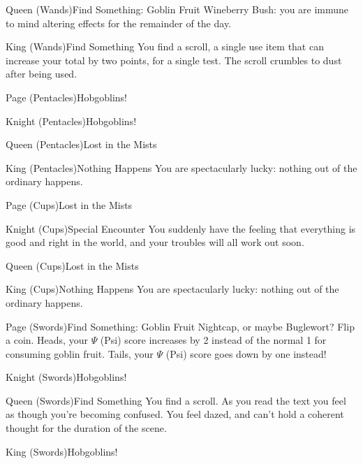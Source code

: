 \documentclass[white]{gl2018}
\begin{document}
\begin{location}{Queen (Wands)}{Find Something: Goblin Fruit}
Wineberry Bush: you are immune to mind altering effects for the remainder of the day.
\end{location}
\begin{location}{King (Wands)}{Find Something}
You find a scroll, a single use item that can increase your total by two points, for a single test.  The scroll crumbles to dust after being used.
\end{location}
\begin{location}{Page (Pentacles)}{Hobgoblins!}
\end{location}
\begin{location}{Knight (Pentacles)}{Hobgoblins!}
\end{location}
\begin{location}{Queen (Pentacles)}{Lost in the Mists}
\end{location}
\begin{location}{King (Pentacles)}{Nothing Happens}
You are spectacularly lucky: nothing out of the ordinary happens.
\end{location}
\begin{location}{Page (Cups)}{Lost in the Mists}
\end{location}
\begin{location}{Knight (Cups)}{Special Encounter}
You suddenly have the feeling that everything is good and right in the world, and your troubles will all work out soon.
\end{location}
\begin{location}{Queen (Cups)}{Lost in the Mists}
\end{location}
\begin{location}{King (Cups)}{Nothing Happens}
You are spectacularly lucky: nothing out of the ordinary happens.
\end{location}
\begin{location}{Page (Swords)}{Find Something: Goblin Fruit}
Nightcap, or maybe Buglewort?  Flip a coin.  Heads, your $\Psi$ (Psi) score increases by 2 instead of the normal 1 for consuming goblin fruit. Tails, your $\Psi$ (Psi) score goes down by one instead!
\end{location}
\begin{location}{Knight (Swords)}{Hobgoblins!}
\end{location}
\begin{location}{Queen (Swords)}{Find Something}
You find a scroll. As you read the text you feel as though you're becoming confused.  You feel dazed, and can't hold a coherent thought for the duration of the scene.
\end{location}
\begin{location}{King (Swords)}{Hobgoblins!}
\end{location}
\end{document}
